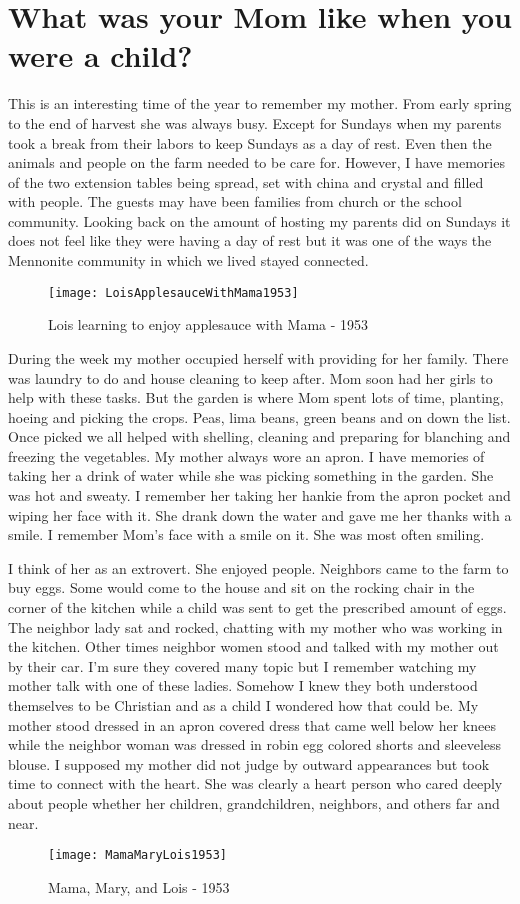 \section{What was your Mom like when you were a child?}

This is an interesting time of the year to remember my mother.
From early spring to the end of harvest she was always busy.
Except for Sundays when my parents took a break from their labors to keep Sundays as a day of rest.
Even then the animals and people on the farm needed to be care for.
However, I have memories of the two extension tables being spread, set with china and crystal and filled with people.
The guests may have been families from church or the school community.
Looking back on the amount of hosting my parents did on Sundays it does not feel like they were having a day of rest but it was one of the ways the Mennonite community in which we lived stayed connected.

\begin{wrapfigure}{R}{0.6\textwidth}
\centering
\texttt{[image: LoisApplesauceWithMama1953]}
\caption{Lois learning to enjoy applesauce with Mama - 1953}
\end{wrapfigure}
During the week my mother occupied herself with providing for her family.
There was laundry to do and house cleaning to keep after.
Mom soon had her girls to help with these tasks.
But the garden is where Mom spent lots of time, planting, hoeing and picking the crops.
Peas, lima beans, green beans and on down the list.
Once picked we all helped with shelling, cleaning and preparing for blanching and freezing the vegetables.
My mother always wore an apron.
I have memories of taking her a drink of water while she was picking something in the garden.
She was hot and sweaty.
I remember her taking her hankie from the apron pocket and wiping her face with it.
She drank down the water and gave me her thanks with a smile.
I remember Mom's face with a smile on it.
She was most often smiling.


I think of her as an extrovert.
She enjoyed people.
Neighbors came to the farm to buy eggs.
Some would come to the house and sit on the rocking chair in the corner of the kitchen while a child was sent to get the prescribed amount of eggs.
The neighbor lady sat and rocked, chatting with my mother who was working in the kitchen.
Other times neighbor women stood and talked with my mother out by their car.
I'm sure they covered many topic but I remember watching my mother talk with one of these ladies.
Somehow I knew they both understood themselves to be Christian and as a child I wondered how that could be.
My mother stood dressed in an apron covered dress that came well below her knees while the neighbor woman was dressed in robin egg colored shorts and sleeveless blouse.
I supposed my mother did not judge by outward appearances but took time to connect with the heart.
She was clearly a heart person who cared deeply about people whether her children, grandchildren, neighbors, and others far and near.
\begin{figure}
\centering
\texttt{[image: MamaMaryLois1953]}
\caption{Mama, Mary, and Lois - 1953}
\end{figure}

